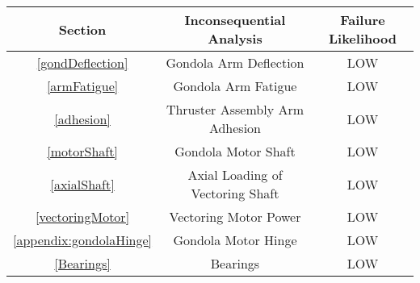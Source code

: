 \documentclass[../main.tex]{subfiles}
\begin{document}
\begin{center}
	 \label{inconsequentialAnalysis}
	\begin{tabular}{|c|c|c|}
	\hline
	\textbf{Section} &\textbf{Inconsequential Analysis} & \textbf{Failure Likelihood} \\
	\hline
	\ref{gondDeflection} & Gondola Arm Deflection  & LOW \\
	\hline
	\ref{armFatigue} & Gondola Arm Fatigue & LOW \\
	\hline
	\ref{adhesion} & Thruster Assembly Arm Adhesion & LOW \\
	\hline
	\ref{motorShaft} & Gondola Motor Shaft & LOW \\
	\hline
	\ref{axialShaft} & Axial Loading of Vectoring Shaft & LOW \\
	\hline
	\ref{vectoringMotor} & Vectoring Motor Power & LOW \\
	\hline
	\ref{appendix:gondolaHinge} & Gondola Motor Hinge & LOW \\
	\hline
	\ref{Bearings} & Bearings & LOW \\
	\hline
	\end{tabular}
\end{center}
\end{document}
